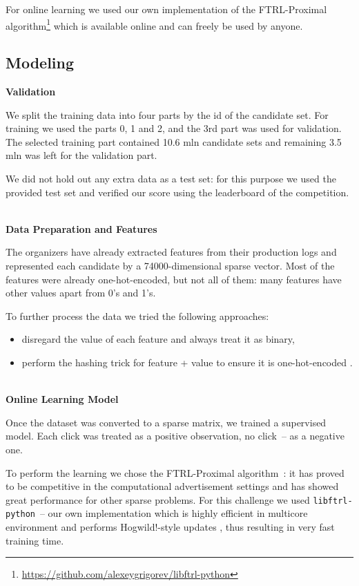 \documentclass{sig-alternate}
\begin{document}
For online learning we used our own implementation of the FTRL-Proximal
algorithm\footnote{\url{https://github.com/alexeygrigorev/libftrl-python}}
which is available online and can freely be used by anyone.


\subsection{Modeling}


\textbf{Validation}

We split the training data into four parts by the id of the candidate set.
For training we used the parts 0, 1 and 2, and the 3rd part was used for validation.
The selected training part contained 10.6 mln candidate sets and remaining 3.5 mln
was left for the validation part. 

We did not hold out any extra data as a test set: for this purpose we used the 
provided test set and verified our score using the leaderboard of the competition. 

\ \\

\textbf{Data Preparation and Features}

The organizers have already extracted features from their production logs
and represented each candidate by a 74000-dimensional sparse vector. Most of the
features were already one-hot-encoded, but not all of them: many features have 
other values apart from 0's and 1's. 

To further process the data we tried the following approaches:

\begin{itemize}
\item disregard the value of each feature and always treat it as binary,
\item perform the hashing trick for feature + value to ensure it is one-hot-encoded \cite{weinberger2009feature}.
\end{itemize}


\ \\

\textbf{Online Learning Model}

Once the dataset was converted to a sparse matrix, we trained a supervised model. 
Each click was treated as a positive observation, no click~-- as a negative one. 

To perform the learning we chose the FTRL-Proximal algorithm~\cite{ftrl}: 
it has proved to be competitive in the computational advertisement settings
and has showed great performance for other sparse problems. For this challenge 
we used \texttt{libftrl-python}~-- our own implementation which is highly 
efficient in multicore environment and performs Hogwild!-style updates \cite{recht2011hogwild}, thus
resulting in very fast training time.
\end{document}
